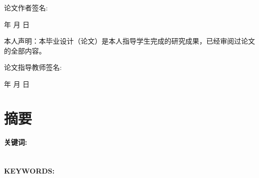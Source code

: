 {  \begin{center}
    论文作者签名:
  \end{center}

  \hfill  年 \hspace{1cm} 月 \hspace{1cm} 日

  \vspace{40pt} %
  本人声明：本毕业设计（论文）是本人指导学生完成的研究成果，已经审阅过论文的全部内容。

  \vspace{20pt} %
  \begin{center}
    论文指导教师签名:
  \end{center}

  \hfill  年 \hspace{1cm} 月 \hspace{1cm} 日

  \thispagestyle{empty}

  \chapter*{\textbf{\centering\erhao\songti 摘\quad 要}}
  \setcounter{page}{1}                                 %

  \fontsize{12pt}{20pt}\selectfont %
  \@cabstract

  \vspace{\baselineskip}

  \noindent\textbf{\songti\sihao 关键词:} \@ckeywords


  \chapter*{\centering{}}

  \fontsize{12pt}{15pt}\selectfont %

  \@eabstract
  \vspace{\baselineskip}

  \noindent\textbf{\sihao KEYWORDS:} \@ekeywords

}

